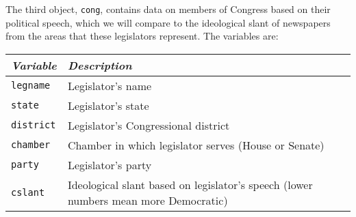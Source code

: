 \documentclass[11pt]{article}
\begin{document}
The third object, {\tt cong}, contains data on members of Congress based on their political speech, which we will compare to the ideological slant of newspapers from the areas that these legislators represent. The variables are: 
\vspace{1mm}
\begin{center}
\begin{tabular}{l p{10cm}}
 \hline
\textit{Variable} & \textit{Description} \\
\hline
{\tt legname} &                    Legislator's name\\
{\tt state} &                      Legislator's state\\
{\tt district} &                   Legislator's Congressional district \\
{\tt chamber} &                    Chamber in which legislator serves (House or Senate)\\
{\tt party} &                      Legislator's party\\
{\tt cslant} &                     Ideological slant based on legislator's speech (lower numbers mean more Democratic) \\
 \hline
\end{tabular}
\end{center}
\end{document}
